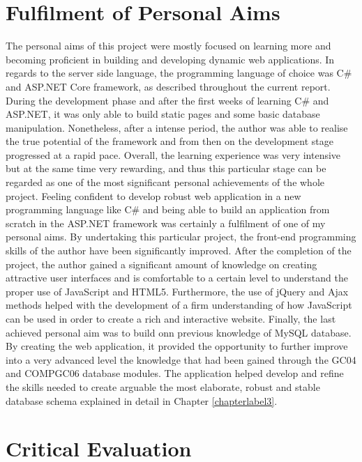 \section{Fulfilment of Personal Aims}

The personal aims of this project were mostly focused on learning more and becoming proficient in building and developing dynamic web applications. In regards to the server side language, the programming language of choice was C\# and ASP.NET Core framework, as described throughout the current report. During the development phase and after the first weeks of learning C\# and ASP.NET, it was only able to build static pages and some basic database manipulation. Nonetheless, after a intense period, the author was able to realise the true potential of the framework and from then on the development stage progressed at a rapid pace. Overall, the learning experience was very intensive but at the same time very rewarding, and thus this particular stage can be regarded as one of the most significant personal achievements of the whole project. Feeling confident to develop robust web application in a new programming language like C\# and being able to build an application from scratch in the ASP.NET framework was certainly a fulfilment of one of my personal aims. By undertaking this particular project, the front-end programming skills of the author have been significantly improved. After the completion of the project, the author gained a significant amount of knowledge on creating attractive user interfaces and is comfortable to a certain level to understand the proper use of JavaScript and HTML5. Furthermore, the use of jQuery and Ajax methods helped with the development of a firm understanding of how JavaScript can be used in order to create a rich and interactive website. Finally, the last achieved personal aim was to build onn previous knowledge of MySQL database. By creating the web application, it provided the opportunity to further improve into a very advanced level the knowledge that had been gained through the GC04 and COMPGC06 database modules. The application helped develop and refine the skills needed to create arguable the most elaborate, robust and stable database schema explained in detail in Chapter \ref{chapterlabel3}.



\section{Critical Evaluation}

